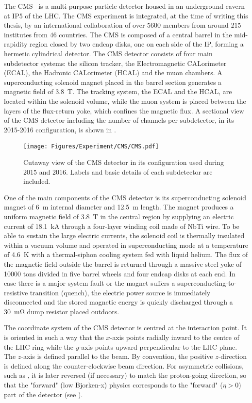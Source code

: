The CMS~\cite{CMS} is a multi-purpose particle detector housed in an underground cavern at IP5 of the LHC. The CMS experiment is integrated, at the time of writing this thesis, by an international collaboration of over 5600 members from around 215 institutes from 46 countries. The CMS is composed of a central barrel in the mid-rapidity region closed by two endcap disks, one on each side of the IP, forming a hermetic cylindrical detector. The CMS detector consists of four main subdetector systems: the silicon tracker, the Electromagnetic CALorimeter (ECAL), the Hadronic CALorimeter (HCAL) and the muon chambers. A superconducting solenoid magnet placed in the barrel section generates a magnetic field of \SI{3.8}{\tesla}. The tracking system, the ECAL and the HCAL, are located within the solenoid volume, while the muon system is placed between the layers of the flux-return yoke, which confines the magnetic flux. A sectional view of the CMS detector including the number of channels per subdetector, in its 2015-2016 configuration, is shown in .

\begin{figure}[!htbp]
 \centering
 \texttt{[image: Figures/Experiment/CMS/CMS.pdf]}
 \caption{Cutaway view of the CMS detector in its configuration used during 2015 and 2016. Labels and basic details of each subdetector are included.~\cite{CMSLayout} }
 \label{fig:CMS2016}
\end{figure}

One of the main components of the CMS detector is its superconducting solenoid magnet of \SI{6}{\m} internal diameter and \SI{12.5}{\m} length. The magnet produces a uniform magnetic field of \SI{3.8}{\tesla} in the central region by supplying an electric current of \SI{18.1}{\kA} through a four-layer winding coil made of NbTi wire. To be able to sustain the large electric currents, the solenoid coil is thermally insulated within a vacuum volume and operated in superconducting mode at a temperature of \SI{4.6}{\K} with a thermal-siphon cooling system fed with liquid helium. The flux of the magnetic field outside the barrel is returned through a massive steel yoke of 10000 tons divided in five barrel wheels and four endcap disks at each end. In case there is a major system fault or the magnet suffers a superconducting-to-resistive transition (quench), the electric power source is immediately disconnected and the stored magnetic energy is quickly discharged through a \SI{30}{\mohm} dump resistor placed outdoors.

The coordinate system of the CMS detector is centred at the interaction point. It is oriented in such a way that the $x$-axis points radially inward to the centre of the LHC ring while the $y$-axis points upward perpendicular to the LHC plane. The $z$-axis is defined parallel to the beam. By convention, the positive $z$-direction is defined along the counter-clockwise beam direction. For asymmetric collisions, such as \RunpPb, it is later reversed (if necessary) to match the proton-going direction, so that the "forward" (low Bjorken-x) physics corresponds to the "forward" ($\eta > 0$) part of the detector (see ).

